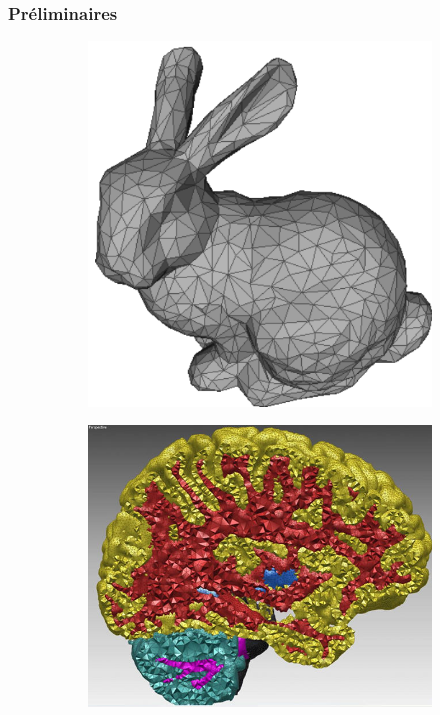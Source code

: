 \documentclass[9pt]{beamer}
\begin{document}
\begin{frame}
\small
\frametitle{Préliminaires}
\begin{figure}[H]
\centering
\begin{subfigure}{.5\textwidth}
  \centering
  \includegraphics[scale=0.10]{Images/bunny}
  \caption{}
\end{subfigure}%
\begin{subfigure}{.5\textwidth}
  \centering
  \includegraphics[scale=0.10]{Images/cerveau}

\end{subfigure}
\end{figure}
\end{frame}
\end{document}
